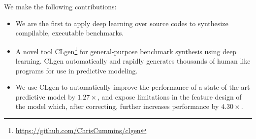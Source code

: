 We make the following contributions:%
\begin{itemize}
  \item We are the first to apply deep learning over source codes to synthesize compilable, executable benchmarks.%
  \item A novel tool CLgen\footnote{\url{https://github.com/ChrisCummins/clgen}} for general-purpose benchmark synthesis using deep learning. CLgen automatically and rapidly generates thousands of human like programs for use in predictive modeling.%
  \item We use CLgen to automatically improve the performance of a state of the art predictive model by $1.27\times$, and expose limitations in the feature design of the model which, after correcting, further increases performance by $4.30\times$.
\end{itemize}
